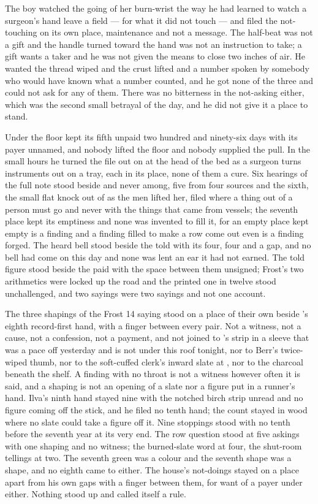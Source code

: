 The boy watched the going of her burn-wrist the way he had learned to watch a surgeon's hand leave a field --- for what it did not touch --- and filed the not-touching on its own place, maintenance and not a message. The half-beat was not a gift and the handle turned toward the hand was not an instruction to take; a gift wants a taker and he was not given the means to close two inches of air. He wanted the thread wiped and the crust lifted and a number spoken by somebody who would have known what a number counted, and he got none of the three and could not ask for any of them. There was no bitterness in the not-asking either, which was the second small betrayal of the day, and he did not give it a place to stand.

\scenebreak

Under the floor  kept its fifth unpaid two hundred and ninety-six days with its payer unnamed, and nobody lifted the floor and nobody supplied the pull. In the small hours he turned the file out on  at the head of the bed as a surgeon turns instruments out on a tray, each in its place, none of them a cure. Six hearings of the full note stood beside and never among, five from four sources and the sixth, the small flat knock out of  as the men lifted her, filed where a thing out of a person must go and never with the things that came from vessels; the seventh place kept its emptiness and none was invented to fill it, for an empty place kept empty is a finding and a finding filled to make a row come out even is a finding forged. The heard bell stood beside the told with its four, four and a gap, and no bell had come on this day and none was lent an ear it had not earned. The told figure stood beside the paid with the space between them unsigned; Frost's two arithmetics were locked up the road and the printed one in twelve stood unchallenged, and two sayings were two sayings and not one account.

The three shapings of the Frost 14 saying stood on a place of their own beside 's eighth record-first hand, with a finger between every pair. Not a witness, not a cause, not a confession, not a payment, and not joined to 's strip in a sleeve that was a pace off yesterday and is not under this roof tonight, nor to Berr's twice-wiped thumb, nor to the soft-cuffed clerk's inward slate at , nor to the charcoal beneath the shelf. A finding with no throat is not a witness however often it is said, and a shaping is not an opening of a slate nor a figure put in a runner's hand. Ilva's ninth hand stayed nine with the notched birch strip unread and no figure coming off the stick, and he filed no tenth hand; the count stayed in wood where no slate could take a figure off it. Nine stoppings stood with no tenth before the seventh year at its very end. The row question stood at five askings with one shaping and no witness; the burned-slate word at four, the shut-room tellings at two. The seventh green was a colour and the seventh shape was a shape, and no eighth came to either. The house's not-doings stayed on a place apart from his own gaps with a finger between them, for want of a payer under either. Nothing stood up and called itself a rule.

